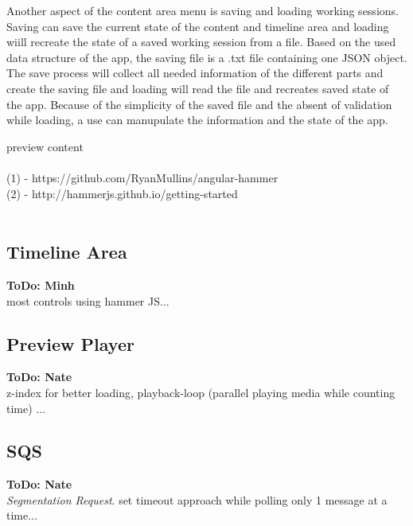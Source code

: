 \documentclass[conference]{IEEEtran}
\begin{document}
Another aspect of the content area menu is saving and loading working sessions. Saving can save the current state of the content and timeline area and loading wiill recreate the state of a saved working session from a file. Based on the used data structure of the app, the saving file is a .txt file containing one JSON object. The save process will collect all needed information of the different parts and create the saving file and loading will read the file and recreates saved state of the app. Because of the simplicity of the saved file and the absent of validation while loading, a use can manupulate the information and the state of the app.

preview content\\
\\
(1) - https://github.com/RyanMullins/angular-hammer\\
(2) - http://hammerjs.github.io/getting-started\\
\\

\subsection{Timeline Area}
\textbf{ToDo: Minh} \\
most controls using hammer JS...

\newpage

\subsection{Preview Player}
\textbf{ToDo: Nate} \\
z-index for better loading, playback-loop (parallel playing media while counting time) ...

\subsection{SQS}
\textbf{ToDo: Nate} \\
\textit{Segmentation Request}.
set timeout approach while polling only 1 message at a time...
\end{document}
